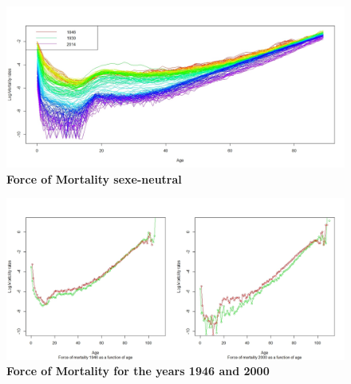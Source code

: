 \documentclass{beamer}
\begin{document}
\begin{frame}
\begin{figure}
  \centering
   \includegraphics[scale=0.3]{force_mortality_male.jpeg}
  \caption{\textbf{Force of Mortality sexe-neutral}}
  \end{figure}

\end{frame}


\begin{frame}

\begin{figure}
  \centering
   \includegraphics[scale=0.2]{force_mrotality_1946_2000.jpeg}
  \caption{\textbf{Force of Mortality for the years 1946 and 2000}}
  
\end{figure}

\end{frame}
\end{document}
